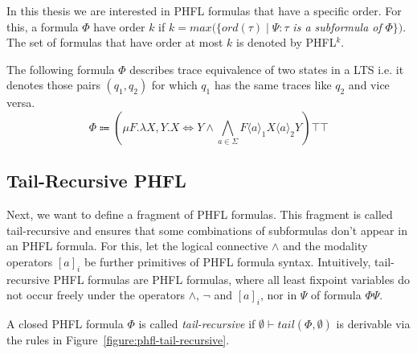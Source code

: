 In this thesis we are interested in PHFL formulas that have a specific order. For this, a formula $\Phi$ have order $k$
if $k = max(\{ord(\tau)\mid \Psi \colon \tau$ \textit{is a subformula of} $\Phi\})$. The set of formulas that have
order at most $k$ is denoted by PHFL$^k$.

\begin{example}{\cite{lange2014capturing}}
    The following formula $\Phi$ describes trace equivalence of two states in a LTS i.e. it denotes those pairs $
    (q_1, q_2)$ for which $q_1$ has the same traces like $q_2$ and vice versa.
    \[\Phi \Coloneqq (\mu F. \lambda X, Y. X \Leftrightarrow Y \wedge \underset{a \in \Sigma}{\bigwedge} F \langle a
    \rangle_1 X \langle a \rangle_2 Y)\top \top\]
\end{example}

\subsection{Tail-Recursive PHFL}\label{subsec:tail-recursivePhfl}

Next, we want to define a fragment of PHFL formulas. This fragment is called tail-recursive and ensures that
some combinations of subformulas don't appear in an PHFL formula. For this, let the logical connective
$\wedge$ and the modality operators $[a]_i$ be further primitives of PHFL formula syntax. Intuitively, tail-recursive
PHFL formulas are PHFL formulas, where all least fixpoint variables do not occur freely under the operators
$\wedge$, $\neg$ and $[a]_i$, nor in $\Psi$ of formula $\Phi\Psi$.

\begin{definition}
    A closed PHFL formula $\Phi$ is called \emph{tail-recursive} if $\emptyset \vdash tail(\Phi, \emptyset)$ is
    derivable via the rules in Figure~\ref{figure:phfl-tail-recursive}.
\end{definition}

